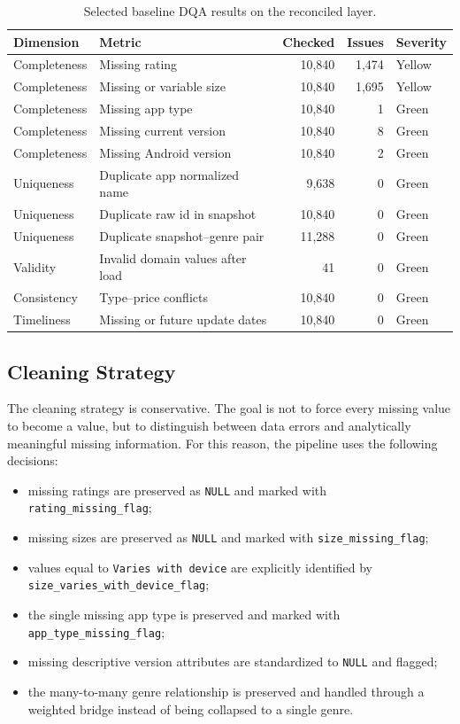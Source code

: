 \documentclass[11pt,a4paper]{article}
\begin{document}
\begin{table}[H]
\centering
\caption{Selected baseline DQA results on the reconciled layer.}
\label{tab:baseline_dqa}
\begin{tabular}{@{}llrrl@{}}
\toprule
\textbf{Dimension} & \textbf{Metric} & \textbf{Checked} & \textbf{Issues} & \textbf{Severity} \\
\midrule
Completeness & Missing rating & 10,840 & 1,474 & Yellow \\
Completeness & Missing or variable size & 10,840 & 1,695 & Yellow \\
Completeness & Missing app type & 10,840 & 1 & Green \\
Completeness & Missing current version & 10,840 & 8 & Green \\
Completeness & Missing Android version & 10,840 & 2 & Green \\
Uniqueness & Duplicate app normalized name & 9,638 & 0 & Green \\
Uniqueness & Duplicate raw id in snapshot & 10,840 & 0 & Green \\
Uniqueness & Duplicate snapshot--genre pair & 11,288 & 0 & Green \\
Validity & Invalid domain values after load & 41 & 0 & Green \\
Consistency & Type--price conflicts & 10,840 & 0 & Green \\
Timeliness & Missing or future update dates & 10,840 & 0 & Green \\
\bottomrule
\end{tabular}
\end{table}

\subsection{Cleaning Strategy}
The cleaning strategy is conservative. The goal is not to force every missing value to become a value, but to distinguish between data errors and analytically meaningful missing information. For this reason, the pipeline uses the following decisions:
\begin{itemize}[leftmargin=1.5em]
    \item missing ratings are preserved as \texttt{NULL} and marked with \texttt{rating\_missing\_flag};
    \item missing sizes are preserved as \texttt{NULL} and marked with \texttt{size\_missing\_flag};
    \item values equal to \texttt{Varies with device} are explicitly identified by \texttt{size\_varies\_with\_device\_flag};
    \item the single missing app type is preserved and marked with \texttt{app\_type\_missing\_flag};
    \item missing descriptive version attributes are standardized to \texttt{NULL} and flagged;
    \item the many-to-many genre relationship is preserved and handled through a weighted bridge instead of being collapsed to a single genre.
\end{itemize}
\end{document}
